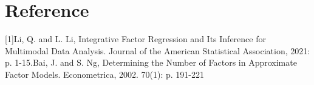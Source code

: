 \documentclass{article}
\begin{document}
\section{Reference}
[1]Li, Q. and L. Li, Integrative Factor Regression and Its Inference for Multimodal Data Analysis. Journal of the American Statistical Association, 2021: p. 1-15.\newline
[2]Bai, J. and S. Ng, Determining the Number of Factors in Approximate Factor Models. Econometrica, 2002. 70(1): p. 191-221
\end{document}
